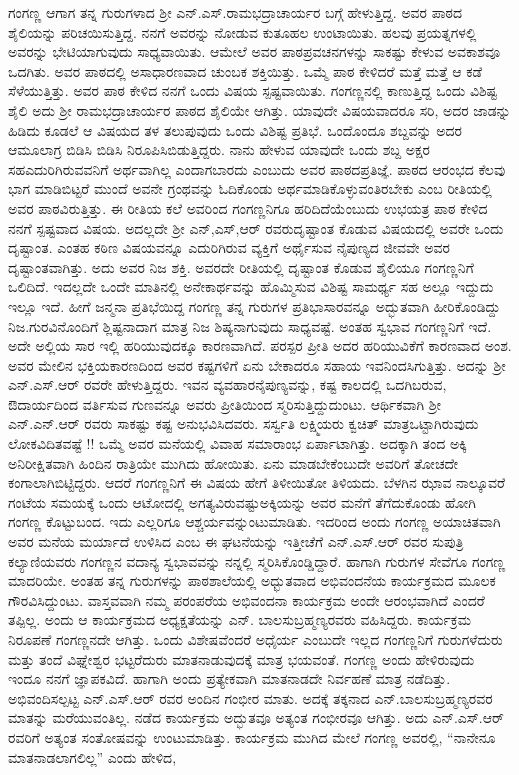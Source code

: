 {ಗಂಗಣ್ಣ ಆಗಾಗ ತನ್ನ ಗುರುಗಳಾದ ಶ್ರೀ ಎನ್.ಎಸ್.ರಾಮಭದ್ರಾಚಾರ್ಯರ ಬಗ್ಗೆ ಹೇಳುತ್ತಿದ್ದ. ಅವರ ಪಾಠದ ಶೈಲಿಯನ್ನು ಪರಿಚಯಿಸುತ್ತಿದ್ದ. ನನಗೆ ಅವರನ್ನು ನೋಡುವ ಕುತೂಹಲ ಉಂಟಾಯಿತು. ಹಲವು ಪ್ರಯತ್ನಗಳಲ್ಲಿ ಅವರನ್ನು  ಭೇಟಿಯಾಗುವುದು ಸಾಧ್ಯವಾಯಿತು. ಆಮೇಲೆ ಅವರ ಪಾಠಪ್ರವಚನಗಳನ್ನು ಸಾಕಷ್ಟು ಕೇಳುವ ಅವಕಾಶವೂ ಒದಗಿತು. ಅವರ ಪಾಠದಲ್ಲಿ ಅಸಾಧಾರಣವಾದ ಚುಂಬಕ ಶಕ್ತಿಯಿತ್ತು. ಒಮ್ಮೆ ಪಾಠ ಕೇಳಿದರೆ ಮತ್ತೆ ಮತ್ತೆ ಆ ಕಡೆ ಸೆಳೆಯುತ್ತಿತ್ತು. ಅವರ ಪಾಠ ಕೇಳಿದ ನನಗೆ ಒಂದು ವಿಷಯ ಸ್ಪಷ್ಟವಾಯಿತು. ಗಂಗಣ್ಣನಲ್ಲಿ ಕಾಣುತ್ತಿದ್ದ ಒಂದು ವಿಶಿಷ್ಟ ಶೈಲಿ ಅದು ಶ್ರೀ ರಾಮಭದ್ರಾಚಾರ್ಯರ ಪಾಠದ ಶೈಲಿಯೇ ಆಗಿತ್ತು. ಯಾವುದೇ ವಿಷಯ\-ವಾದರೂ ಸರಿ, ಅದರ ಜಾಡನ್ನು ಹಿಡಿದು ಕೂಡಲೆ ಆ ವಿಷಯದ ತಳ ತಲುಪು\-ವುದು ಒಂದು ವಿಶಿಷ್ಟ ಪ್ರತಿಭೆ. ಒಂದೊಂದೂ ಶಬ್ದವನ್ನು ಅದರ ಆಮೂಲಾಗ್ರ ಬಿಡಿಸಿ ಬಿಡಿಸಿ ನಿರೂಪಿಸಿಬಿಡುತ್ತಿದ್ದರು. ನಾನು ಹೇಳುವ ಯಾವುದೇ ಒಂದು ಶಬ್ದ ಅಕ್ಷರ ಸಹ\break ಎದುರಿಗಿರುವವನಿಗೆ ಅರ್ಥವಾಗಿಲ್ಲ ಎಂದಾಗಬಾರದು ಎಂಬುದು ಅವರ ಪಾಠದ\break ಪ್ರತಿಜ್ಞೆ. ಪಾಠದ ಆರಂಭದ ಕೆಲವು ಭಾಗ ಮಾಡಿಬಿಟ್ಟರೆ ಮುಂದೆ ಅವನೇ ಗ್ರಂಥವನ್ನು ಓದಿಕೊಂಡು ಅರ್ಥಮಾಡಿಕೊಳ್ಳುವಂತಿರಬೇಕು ಎಂಬ ರೀತಿಯಲ್ಲಿ ಅವರ ಪಾಠವಿರುತ್ತಿತ್ತು. ಈ ರೀತಿಯ ಕಲೆ ಅವರಿಂದ ಗಂಗಣ್ಣನಿಗೂ ಹರಿದಿದೆಯೆಂಬುದು ಉಭಯತ್ರ ಪಾಠ ಕೇಳಿದ ನನಗೆ ಸ್ಪಷ್ಟವಾದ ವಿಷಯ. ಅದಲ್ಲದೇ ಶ್ರೀ ಎನ್,ಎಸ್,ಆರ್ ರವರು\break ದೃಷ್ಟಾಂತ ಕೊಡುವ ವಿಷಯದಲ್ಲಿ ಅವರೇ ಒಂದು ದೃಷ್ಟಾಂತ. ಎಂತಹ ಕಠಿಣ ವಿಷಯ\-ವನ್ನೂ ಎದುರಿಗಿರುವ ವ್ಯಕ್ತಿಗೆ ಅರ್ಥೈಸುವ ನೈಪುಣ್ಯದ ಜೀವವೇ ಅವರ ದೃಷ್ಟಾಂತ\-ವಾಗಿತ್ತು. ಅದು ಅವರ ನಿಜ ಶಕ್ತಿ. ಅವರದೇ ರೀತಿಯಲ್ಲಿ ದೃಷ್ಟಾಂತ ಕೊಡುವ ಶೈಲಿಯೂ ಗಂಗಣ್ಣನಿಗೆ ಒಲಿದಿದೆ. ಇದಲ್ಲದೇ ಒಂದೇ ಮಾತಿನಲ್ಲಿ ಅನೇಕಾರ್ಥವನ್ನು ಹೊಮ್ಮಿಸುವ ವಿಶಿಷ್ಟ ಸಾಮರ್ಥ್ಯ ಸಹ ಅಲ್ಲೂ ಇದ್ದುದು ಇಲ್ಲೂ ಇದೆ. ಹೀಗೆ ಜನ್ಮನಾ ಪ್ರತಿಭೆ\-ಯಿದ್ದ ಗಂಗಣ್ಣ ತನ್ನ ಗುರುಗಳ ಪ್ರತಿಭಾಸಾರವನ್ನೂ  ಅದ್ಭುತವಾಗಿ ಹೀರಿಕೊಂಡಿದ್ದು ನಿಜ.\break ಗುರವಿನೊಂದಿಗೆ ಶ್ಲಿಷ್ಟನಾದಾಗ ಮಾತ್ರ ನಿಜ ಶಿಷ್ಯನಾಗುವುದು ಸಾಧ್ಯವಷ್ಟೆ. ಅಂತಹ ಸ್ವಭಾವ ಗಂಗಣ್ಣನಿಗೆ ಇದೆ. ಅದೇ ಅಲ್ಲಿಯ ಸಾರ ಇಲ್ಲಿ ಹರಿಯುವುದಕ್ಕೂ ಕಾರಣ\-ವಾಗಿದೆ. ಪರಸ್ಪರ ಪ್ರೀತಿ ಅದರ ಹರಿಯುವಿಕೆಗೆ ಕಾರಣವಾದ ಅಂಶ. ಅವರ ಮೇಲಿನ ಭಕ್ತಿಯಕಾರಣದಿಂದ ಅವರ ಕಷ್ಟಗಳಿಗೆ ಏನು ಬೇಕಾದರೂ ಸಹಾಯ ಇವನಿಂದ\break ಸಿಗುತ್ತಿತ್ತು. ಅದನ್ನು ಶ್ರೀ ಎನ್.ಎಸ್.ಆರ್ ರವರೇ ಹೇಳುತ್ತಿದ್ದರು. ಇವನ ವ್ಯವಹಾರ\break ನೈಪುಣ್ಯವನ್ನು, ಕಷ್ಟ ಕಾಲದಲ್ಲಿ ಒದಗಿಬರುವ, ಔದಾರ್ಯದಿಂದ ವರ್ತಿಸುವ ಗುಣ\-ವನ್ನೂ ಅವರು ಪ್ರೀತಿಯಿಂದ ಸ್ಮರಿಸುತ್ತಿದ್ದುದುಂಟು. ಆರ್ಥಿಕವಾಗಿ ಶ್ರೀ ಎನ್.ಎನ್.ಆರ್ ರವರು ಸಾಕಷ್ಟು ಕಷ್ಟ ಅನುಭವಿಸಿದವರು. ಸರ್ಸ್ವತಿ ಲಕ್ಷ್ಮಿಯರು ಕ್ವಚಿತ್ ಮಾತ್ರ\break ಒಟ್ಟಾಗಿರುವುದು ಲೋಕವಿದಿತವಷ್ಟೆ !! ಒಮ್ಮೆ ಅವರ ಮನೆಯಲ್ಲಿ ವಿವಾಹ ಸಮಾರಾಂಭ ಏರ್ಪಾಟಾಗಿತ್ತು. ಅದಕ್ಕಾಗಿ ತಂದ ಅಕ್ಕಿ ಅನಿರೀಕ್ಷಿತವಾಗಿ ಹಿಂದಿನ ರಾತ್ರಿಯೇ ಮುಗಿದು ಹೋಯಿತು. ಏನು ಮಾಡಬೇಕೆಂಬುದೇ ಅವರಿಗೆ ತೋಚದೇ ಕಂಗಾಲಾಗಿಬಿಟ್ಟಿದ್ದರು. ಆದರೆ ಗಂಗಣ್ಣನಿಗೆ ಈ ವಿಷಯ ಹೇಗೆ ತಿಳೀಯಿತೋ ತಿಳಿಯದು. ಬೆಳಗಿನ ಝಾವ ನಾಲ್ಕೂವರೆ ಗಂಟೆಯ ಸಮಯಕ್ಕೆ ಒಂದು ಆಟೋದಲ್ಲಿ ಅಗತ್ಯವಿರುವಷ್ಟು\break ಅಕ್ಕಿಯನ್ನು ಅವರ ಮನೆಗೆ ತೆಗೆದುಕೊಂಡು ಹೋಗಿ ಗಂಗಣ್ಣ ಕೊಟ್ಟುಬಂದ. ಇದು ಎಲ್ಲರಿಗೂ ಆಶ್ಚರ್ಯವನ್ನುಂಟುಮಾಡಿತು. ಇದರಿಂದ ಅಂದು ಗಂಗಣ್ಣ ಅಯಾಚಿತ\-ವಾಗಿ ಅವರ ಮನೆಯ ಮರ್ಯಾದೆ ಉಳಿಸಿದ ಎಂಬ ಈ ಘಟನೆಯನ್ನು ಇತ್ತೀಚೆಗೆ ಎನ್.ಎಸ್.ಆರ್ ರವರ ಸುಪುತ್ರಿ ಕಲ್ಯಾಣಿಯವರು ಗಂಗಣ್ಣನ ವದಾನ್ಯ ಸ್ವಭಾವ\-ವನ್ನು ನನ್ನಲ್ಲಿ ಸ್ಮರಿಸಿಕೊಂಡ್ಡಿದ್ದಾರೆ. ಹಾಗಾಗಿ ಗುರುಗಳ ಸೇವೆಗೂ ಗಂಗಣ್ಣ ಮಾದರಿಯೇ. ಅಂತಹ ತನ್ನ ಗುರುಗಳನ್ನು ಪಾಠಶಾಲೆಯಲ್ಲಿ ಅಧ್ಭುತವಾದ ಅಭಿವಂದನೆಯ ಕಾರ್ಯಕ್ರಮದ ಮೂಲಕ ಗೌರವಿಸಿದ್ದುಂಟು. ವಾಸ್ತವವಾಗಿ ನಮ್ಮ ಪರಂಪರೆಯ ಅಭಿವಂದನಾ ಕಾರ್ಯಕ್ರಮ ಅಂದೇ ಆರಂಭವಾಗಿದೆ ಎಂದರೆ ತಪ್ಪಿಲ್ಲ. ಅಂದು ಆ ಕಾರ್ಯಕ್ರಮದ ಅಧ್ಯಕ್ಷತೆಯನ್ನು ಎನ್. ಬಾಲಸುಬ್ರಹ್ಮಣ್ಯರವರು ವಹಿಸಿದ್ದರು. ಕಾರ್ಯಕ್ರಮ ನಿರೂಪಣೆ ಗಂಗಣ್ಣನದೇ ಆಗಿತ್ತು. ಒಂದು ವಿಶೇಷವೆಂದರೆ ಅಧೈರ್ಯ ಎಂಬುದೇ ಇಲ್ಲದ ಗಂಗಣ್ಣನಿಗೆ ಗುರುಗಳೆದುರು ಮತ್ತು ತಂದೆ ವಿಘ್ನೇಶ್ವರ ಭಟ್ಟರೆದುರು ಮಾತನಾಡುವುದಕ್ಕೆ ಮಾತ್ರ ಭಯವಂತೆ. ಗಂಗಣ್ಣ ಅಂದು ಹೇಳಿರುವುದು ಇಂದೂ ನನಗೆ ಜ್ಞಾಪಕ\-ವಿದೆ. ಹಾಗಾಗಿ ಅಂದು ಪ್ರತ್ಯೇಕವಾಗಿ ಮಾತನಾಡದೇ ನಿರ್ವಹಣೆ ಮಾತ್ರ ನಡೆದಿತ್ತು. ಅಭಿವಂದಿಸಲ್ಪಟ್ಟ ಎನ್.ಎಸ್.ಆರ್ ರವರ ಅಂದಿನ ಗಂಭೀರ ಮಾತು. ಅದಕ್ಕೆ ತಕ್ಕನಾದ ಎನ್.ಬಾಲಸುಬ್ರಹ್ಮಣ್ಯರವರ ಮಾತನ್ನು ಮರೆಯುವಂತಿಲ್ಲ. ನಡೆದ ಕಾರ್ಯಕ್ರಮ ಅದ್ಭುತವೂ ಅತ್ಯಂತ ಗಂಭೀರವೂ ಆಗಿತ್ತು. ಅದು ಎನ್.ಎಸ್.ಆರ್ ರವರಿಗೆ ಅತ್ಯಂತ ಸಂತೋಷವನ್ನು ಉಂಟುಮಾಡಿತ್ತು. ಕಾರ್ಯಕ್ರಮ ಮುಗಿದ ಮೇಲೆ ಗಂಗಣ್ಣ ಅವರಲ್ಲಿ, “ನಾನೇನೂ ಮಾತನಾಡಲಾಗಲಿಲ್ಲ” ಎಂದು ಹೇಳಿದ, }
